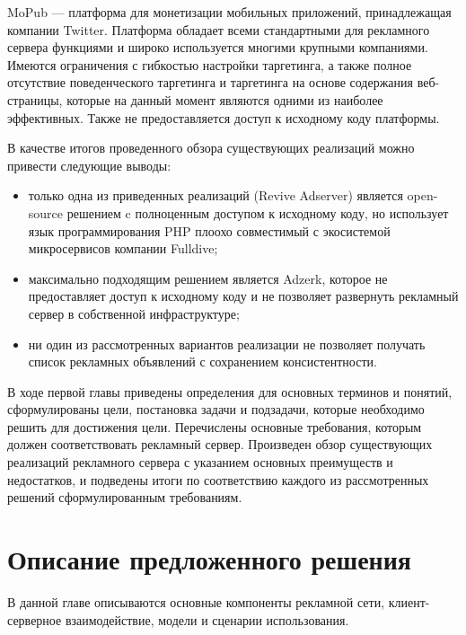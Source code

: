 \documentclass[times]{itmo-student-thesis}
\begin{document}
MoPub \cite{mopub} — платформа для монетизации мобильных приложений, принадлежащая компании Twitter. Платформа обладает всеми стандартными для рекламного сервера функциями и широко используется многими крупными компаниями. Имеются ограничения с гибкостью настройки таргетинга, а также полное отсутствие поведенческого таргетинга и таргетинга на основе содержания веб-страницы, которые на данный момент являются одними из наиболее эффективных. Также не предоставляется доступ к исходному коду платформы.

В качестве итогов проведенного обзора существующих реализаций можно привести следующие выводы:
\begin{itemize}
\item только одна из приведенных реализаций (Revive Adserver) является open-source решением c полноценным доступом к исходному коду, но использует язык программирования PHP плоохо совместимый с экосистемой микросервисов компании Fulldive;
\item максимально подходящим решением является Adzerk, которое не предоставляет доступ к исходному коду и не позволяет развернуть рекламный сервер в собственной инфраструктуре;
\item ни один из рассмотренных вариантов реализации не позволяет получать список рекламных объявлений с сохранением консистентности.
\end{itemize}

\finishrelatedwork %

\chapterconclusion

В ходе первой главы приведены определения для основных терминов и понятий, сформулированы цели, постановка задачи и подзадачи, которые необходимо решить для достижения цели. Перечислены основные требования, которым должен соответствовать рекламный сервер. Произведен обзор существующих реализаций рекламного сервера с указанием основных преимуществ и недостатков, и подведены итоги по соответствию каждого из рассмотренных решений сформулированным требованиям.





\chapter{Описание предложенного решения}\label{chapter:2}

В данной главе описываются основные компоненты рекламной сети, клиент-серверное взаимодействие, модели и сценарии использования.
\end{document}
